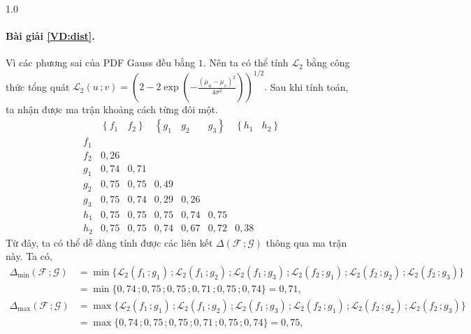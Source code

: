 \documentclass[a4paper,oneside]{book} %
\theoremstyle{plain}
\theoremstyle{plain}
\theoremstyle{nonumberplain}
\begin{document}
\begin{spacing}{1.0}
{}

	
	\paragraph{Bài giải  \ref{VD:dist}.} Vì các phương sai của PDF Gauss đều bằng $1$. Nên ta có thể tính $\mathcal{L}_2$ bằng công thức tổng quát 
	$
	\mathcal{L}_2(u\,;v)=\left(2-2\exp\left(-\frac{(\mu_u-\mu_v)^2}{4\sigma^2}\right)\right)^{1/2}.
	$
	Sau khi tính toán, ta nhận được ma trận khoảng cách từng đôi một.
	$$
	\begin{array}{c|ccccccc}
		& \left\{f_1\right.     & \left.f_2\right\}     & \left\{g_1\right.     & g_2     & \left.g_3\right\}     & \left\{h_1\right.     & \left.h_2\right\}     \\
		\hline
		f_1     &         &         &         &         &         &         &         \\
		f_2     & 0{,}26  &         &         &         &         &         &         \\
		g_1     & 0{,}74  & 0{,}71  &         &         &         &         &         \\
		g_2     & 0{,}75  & 0{,}75  & 0{,}49  &         &         &         &         \\
		g_3     & 0{,}75  & 0{,}74  & 0{,}29  & 0{,}26  &         &         &         \\
		h_1     & 0{,}75  & 0{,}75  & 0{,}75  & 0{,}74  & 0{,}75  &         &         \\
		h_2     & 0{,}75  & 0{,}75  & 0{,}74  & 0{,}67  & 0{,}72  & 0{,}38  &         
	\end{array}
	$$
	Từ đây, ta có thể dễ dàng tính được các liên kết $\Delta(\mathcal{F}\,; \mathcal{G}) $ thông qua ma trận này. Ta có,
	{\small
\begin{align*}
	\Delta_{\min}(\mathcal{F}\,; \mathcal{G}) 
	&= \min\big\{
	\mathcal{L}_2(f_1\,; g_1)\,; \mathcal{L}_2(f_1\,; g_2)\,; \mathcal{L}_2(f_1\,; g_3)\,;
	\mathcal{L}_2(f_2\,; g_1)\,; \mathcal{L}_2(f_2\,; g_2)\,; \mathcal{L}_2(f_2\,; g_3)
	\big\} \\
	&=\min\{0{,}74\,; 0{,}75\,; 0{,}75\,; 0{,}71\,; 0{,}75\,; 0{,}74\} = 0{,}71,\\[3pt]
	\Delta_{\max}(\mathcal{F}\,; \mathcal{G}) 
	&= \max\big\{
	\mathcal{L}_2(f_1\,; g_1)\,; \mathcal{L}_2(f_1\,; g_2)\,; \mathcal{L}_2(f_1\,; g_3)\,;
	\mathcal{L}_2(f_2\,; g_1)\,; \mathcal{L}_2(f_2\,; g_2)\,; \mathcal{L}_2(f_2\,; g_3)
	\big\}\\
	&= \max\{0{,}74\,; 0{,}75\,; 0{,}75\,; 0{,}71\,; 0{,}75\,; 0{,}74\} = 0{,}75,\\[3pt]

\end{align*}}
\end{spacing}
\end{document}
